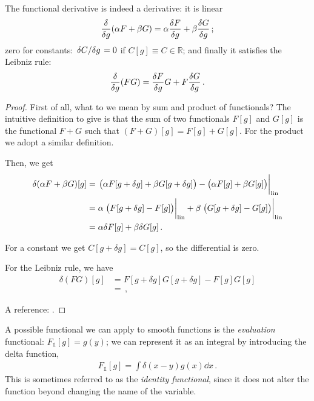 \documentclass[main.tex]{subfiles}
\begin{document}
\begin{claim}
The functional derivative is indeed a derivative: it is linear 
%
\begin{align}
\fdv{}{g} \qty(\alpha F + \beta  G) = \alpha \fdv{F}{g} + \beta \fdv{G}{g}
\,;
\end{align}
%
zero for constants: \(\fdv*{C}{g} = 0 \) if \(C[g] \equiv C \in \mathbb{R}\); and finally it satisfies the Leibniz rule: 
%
\begin{align}
\fdv{}{g} \qty(FG)= \fdv{F}{g} G + F \fdv{G}{g}
\,.
\end{align}
\end{claim}

\begin{proof}
First of all, what to we mean by sum and product of functionals? 
The intuitive definition to give is that the sum of two functionals \(F[g]\) and \(G[g]\) is the functional \(F+G\) such that \((F+G)[g] = F[g] + G[g]\).
For the product we adopt a similar definition. 

Then, we get 
%
\begin{align}
\delta (\alpha F + \beta G)[g] &= \eval{\qty(\alpha F[g+ \delta g] + \beta G[g + \delta g]) - \qty(\alpha F[g] + \beta G[g])}_{\text{lin}}
\\
&= \alpha \eval{\qty(F[g + \delta g] - F[g])}_{\text{lin}} + \beta \eval{\qty(G [g + \delta g] - G[g])}_{\text{lin}}  \\
&= \alpha \delta F [g] + \beta \delta G[g]
\,.
\end{align}

For a constant we get \(C[g + \delta g] = C[g]\), so the differential is zero. 

For the Leibniz rule, we have 
%
\begin{align}
\delta (FG)[g] &= F[g + \delta g] G[g + \delta g] - F[g] G[g]  \\
&= 
\,,
\end{align}
%

A reference: \cite[]{engelDensityFunctionalTheory2011}.
\end{proof}

A possible functional we can apply to smooth functions is the \emph{evaluation} functional: \(F_{\mathbb{1}}[g] = g(y )\); we can represent it as an integral by introducing the delta function, 
%
\begin{align}
F_{\mathbb{1}} [g]  = \int \delta (x - y) g(x) \dd{x}
\,.
\end{align}
%
This is sometimes referred to as the \emph{identity functional}, since it does not alter the function beyond changing the name of the variable.
\end{document}
